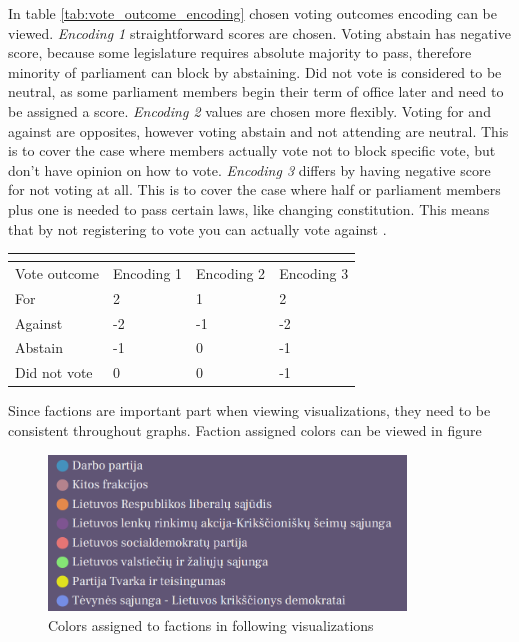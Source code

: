 \documentclass[a4paper,12pt]{article}
\begin{document}
	In table \ref{tab:vote_outcome_encoding} chosen voting outcomes encoding can be viewed. \textit{Encoding 1} straightforward scores are chosen. Voting abstain has negative score, because some legislature requires absolute majority to pass, therefore minority of parliament can block by abstaining. Did not vote is considered to be neutral, as some parliament members begin their term of office later and need to be assigned a score. \textit{Encoding 2} values are chosen more flexibly. Voting for and against are opposites, however voting abstain and not attending are neutral. This is to cover the case where members actually vote not to block specific vote, but don't have opinion on how to vote. \textit{Encoding 3} differs by having negative score for not voting at all. This is to cover the case where half or parliament members plus one is needed to pass certain laws, like changing constitution. This means that by not registering to vote you can actually vote against \cite{konstitucija}.
	
	\noindent
	\begin{center}
		\begin{tabular}{L{3cm} C{2cm} C{2cm} C{2cm}}
			\\ 
			\hline
			Vote outcome & Encoding 1 & Encoding 2& Encoding 3  \\\hline
			For & 2 & 1 & 2 \\
			Against & -2 & -1 & -2\\
			Abstain & -1 & 0 & -1\\
			Did not vote & 0 & 0 & -1\\
			\hline
		\end{tabular}
		 \label{tab:vote_outcome_encoding}
	\end{center}
	
	Since factions are important part when viewing visualizations, they need to be consistent throughout graphs. Faction assigned colors can be viewed in figure 
	
	\begin{figure}[H]	
		\centering
		\includegraphics[width=9.5cm]{images/faction_colors.png}
		\caption{Colors assigned to factions in following visualizations}
		\label{fig:faction_colors}
	\end{figure}
	
\end{document}
